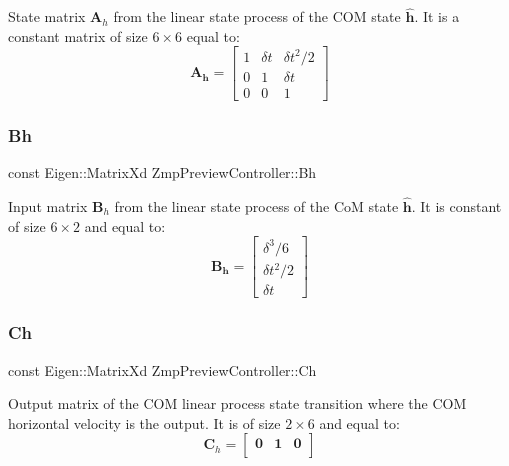 State matrix $\mathbf{A}_h$ from the linear state process of the C\+OM state $\hat{\mathbf{h}}$. It is a constant matrix of size $6\times6$ equal to\+: \[ \mathbf{A_h} = \left[ \begin{array}{ccc} 1 & \delta t & \delta t^2/2 \\ 0 & 1 & \delta t \\ 0 & 0 & 1 \end{array} \right] \] \hypertarget{classZmpPreviewController_a98bd07d03d0a6004b345ef4310cf17b6}{}\label{classZmpPreviewController_a98bd07d03d0a6004b345ef4310cf17b6} 
\subsubsection{\texorpdfstring{Bh}{Bh}}
{\footnotesize\ttfamily const Eigen\+::\+Matrix\+Xd Zmp\+Preview\+Controller\+::\+Bh\hspace{0.3cm}{\ttfamily [private]}}

Input matrix $\mathbf{B}_h$ from the linear state process of the CoM state $\hat{\mathbf{h}}$. It is constant of size $6\times2$ and equal to\+: \[ \mathbf{B_h} = \left[ \begin{array}{c} \delta^3/6 \\ \delta t^2/2 \\ \delta t \end{array} \right] \] \hypertarget{classZmpPreviewController_a2093754713ffb2a7adcd1310c73bf775}{}\label{classZmpPreviewController_a2093754713ffb2a7adcd1310c73bf775} 
\subsubsection{\texorpdfstring{Ch}{Ch}}
{\footnotesize\ttfamily const Eigen\+::\+Matrix\+Xd Zmp\+Preview\+Controller\+::\+Ch\hspace{0.3cm}{\ttfamily [private]}}

Output matrix of the C\+OM linear process state transition where the C\+OM horizontal velocity is the output. It is of size $2\times6$ and equal to\+: \[ \mathbf{C}_h = \left[\begin{array}{ccc} \mathbf{0} & \mathbf{1} & \mathbf{0} \\ \end{array}\right] \] \hypertarget{classZmpPreviewController_a1a63870dcc3d51a26c4adc9c97e650ff}{}\label{classZmpPreviewController_a1a63870dcc3d51a26c4adc9c97e650ff} 
